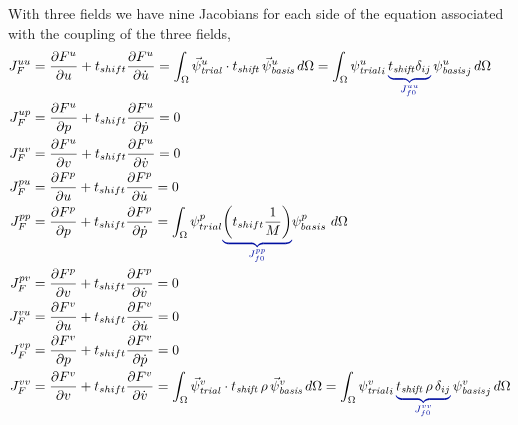 With three fields we have nine Jacobians for each side of the equation 
associated with the coupling of the three fields, 
\begin{align}
  J_F^{uu} &= \frac{\partial F^u}{\partial u} + t_{shift} \frac{\partial 
F^u}{\partial \dot{u}} = \int_\Omega \trialvec[u] \cdot 
t_\mathit{shift}\,\basisvec[u] \, d\Omega = \int_\Omega \trialscalar[u]_i 
\, 
\eqnannotate{t_\mathit{shift} \delta_{ij}}{J_{f0}^{uu}} \, \basisscalar[u]_j \, 
d\Omega \\
%
J_F^{up} &= \frac{\partial F^u}{\partial p} + t_{shift} \frac{\partial 
F^u}{\partial \dot{p}} = 0 \\
%
J_F^{uv} &= \frac{\partial F^u}{\partial v} + t_{shift} \frac{\partial 
F^u}{\partial \dot{v}} = 0 \\
%
J_F^{pu} &= \frac{\partial F^p}{\partial u} + t_{shift} \frac{\partial 
F^p}{\partial \dot{u}} = 0 \\
%
J_F^{pp} &= \frac{\partial F^p}{\partial p} + t_{shift} \frac{\partial 
F^p}{\partial \dot{p}} = \int_{\Omega} \psi_{trial}^p 
\eqnannotate{\left(t_{shift} \frac{1}{M}\right)}{J_{f0}^{pp}} 
\psi_{basis}^p \ d\Omega \\
%
J_F^{pv} &= \frac{\partial F^p}{\partial v} + t_{shift} \frac{\partial 
F^p}{\partial \dot{v}} = 0 \\
%
J_F^{vu} &= \frac{\partial F^v}{\partial u} + t_{shift} \frac{\partial 
F^v}{\partial \dot{u}} = 0 \\
%
J_F^{vp} &= \frac{\partial F^v}{\partial p} + t_{shift} \frac{\partial 
F^v}{\partial \dot{p}} = 0 \\
%
J_F^{vv} &= \frac{\partial F^v}{\partial v} + t_{shift} \frac{\partial 
F^v}{\partial 
\dot{v}} = \int_\Omega 
\trialvec[v] \cdot t_\mathit{shift}\,\rho\,\basisvec[v] \, d\Omega = 
\int_\Omega 
\trialscalar[v]_i \, 
\eqnannotate{t_\mathit{shift} \, \rho \, \delta_{ij}}{J_{f0}^{vv}} \, 
\basisscalar[v]_j \, 
d\Omega \\
\end{align}

